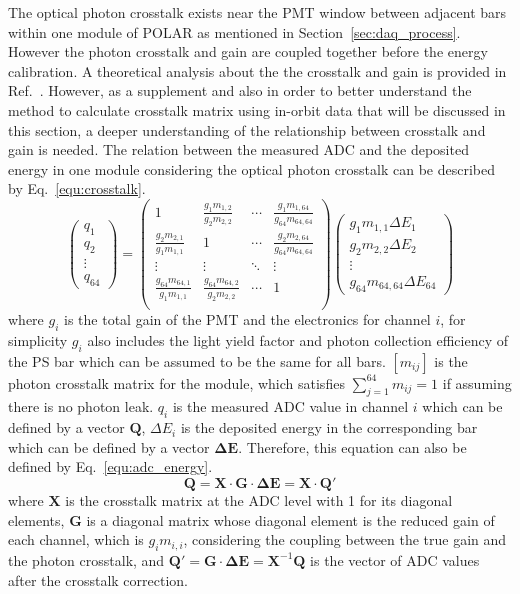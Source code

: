 \documentclass[preprint,sort&compress,12pt]{elsarticle}
\begin{document}
The optical photon crosstalk exists near the PMT window between adjacent bars within one module of POLAR as mentioned in Section~\ref{sec:daq_process}. However the photon crosstalk and gain are coupled together before the energy calibration. A theoretical analysis about the the crosstalk and gain is provided in Ref.~\cite{Xiao2016}. However, as a supplement and also in order to better understand the method to calculate crosstalk matrix using in-orbit data that will be discussed in this section, a deeper understanding of the relationship between crosstalk and gain is needed. The relation between the measured ADC and the deposited energy in one module considering the optical photon crosstalk can be described by Eq.~\eqref{equ:crosstalk}.
\begin{equation}\label{equ:crosstalk}
\begin{pmatrix}
q_1 \\ q_2 \\ \vdots \\ q_{64}
\end{pmatrix}
=
\begin{pmatrix}
1 &
\frac{g_{1} m_{1,2}}{g_{2} m_{2,2}} &
\cdots & \frac{g_{1} m_{1,64}}{g_{64} m_{64,64}} \\
\frac{g_{2} m_{2,1}}{g_{1} m_{1,1}} &
1 &
\cdots &
\frac{g_{2} m_{2,64}}{g_{64} m_{64,64}} \\
\vdots & \vdots & \ddots & \vdots \\
\frac{g_{64} m_{64,1}}{g_{1} m_{1,1}} &
\frac{g_{64} m_{64,2}}{g_{2} m_{2,2}} &
\cdots & 1 \\
\end{pmatrix}
\begin{pmatrix}
g_{1} m_{1,1}\Delta E_1 \\ g_{2} m_{2,2}\Delta E_2 \\ \vdots \\ g_{64} m_{64,64}\Delta E_{64}
\end{pmatrix}
\end{equation}
where $g_i$ is the total gain of the PMT and the electronics for channel $i$, for simplicity $g_i$ also includes the light yield factor and photon collection efficiency of the PS bar which can be assumed to be the same for all bars. $[m_{ij}]$ is the photon crosstalk matrix for the module, which satisfies $\sum_{j=1}^{64} m_{ij}=1$ if assuming there is no photon leak. $q_i$ is the measured ADC value in channel $i$ which can be defined by a vector $\bm{Q}$, $\Delta E_i$ is the deposited energy in the corresponding bar which can be defined by a vector $\bm{\Delta E}$. Therefore, this equation can also be defined by Eq.~\eqref{equ:adc_energy}.
\begin{equation}\label{equ:adc_energy}
\bm{Q} = \bm{X} \cdot \bm{G} \cdot \bm{\Delta E} = \bm{X} \cdot \bm{Q'}
\end{equation}
where $\bm{X}$ is the crosstalk matrix at the ADC level with 1 for its diagonal elements, $\bm{G}$ is a diagonal matrix whose diagonal element is the reduced gain of each channel, which is $g_i m_{i,i}$, considering the coupling between the true gain and the photon crosstalk, and $\bm{Q'} = \bm{G}\cdot\bm{\Delta E} = \bm{X}^{-1}\bm{Q}$ is the vector of ADC values after the crosstalk correction.
\end{document}
